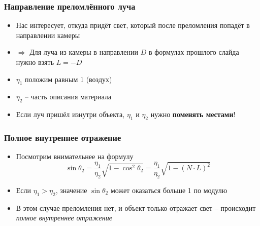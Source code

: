\documentclass[10pt]{beamer}
\begin{document}
\begin{frame}
\frametitle{Направление преломлённого луча}
\begin{itemize}
\item Нас интересует, откуда придёт свет, который после преломления попадёт в направлении камеры
\pause
\item \begin{math}\Longrightarrow\end{math} Для луча из камеры в направлении \begin{math}D\end{math} в формулах прошлого слайда нужно взять \begin{math}L = -D\end{math}
\pause
\item \begin{math}\eta_1\end{math} положим равным 1 (воздух)
\pause
\item \begin{math}\eta_2\end{math} -- часть описания материала
\pause
\item Если луч пришёл изнутри объекта, \begin{math}\eta_1\end{math} и \begin{math}\eta_2\end{math} нужно \textbf{поменять местами}!
\end{itemize}
\end{frame}

\begin{frame}
\frametitle{Полное внутреннее отражение}
\begin{itemize}
\item Посмотрим внимательнее на формулу
\begin{equation*}
\sin\theta_2 = \frac{\eta_1}{\eta_2}\sqrt{1-\cos^2\theta_2} = \frac{\eta_1}{\eta_2}\sqrt{1-(N\cdot L)^2}
\end{equation*}
\pause
\item Если \begin{math}\eta_1 > \eta_2\end{math}, значение \begin{math}\sin\theta_2\end{math} может оказаться больше 1 по модулю
\pause
\item В этом случае преломления нет, и объект только отражает свет -- происходит \textit{полное внутреннее отражение}
\end{itemize}
\end{frame}
\end{document}
